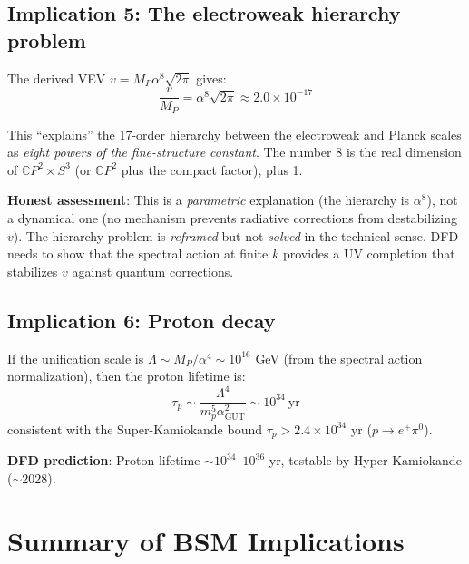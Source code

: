 \documentclass[11pt,a4paper]{article}
\newcommand{\CP}{\mathbb{C}P}
\begin{document}
\subsection{Implication 5: The electroweak hierarchy problem}

The derived VEV $v = M_P \alpha^8 \sqrt{2\pi}$ gives:
\begin{equation}
\frac{v}{M_P} = \alpha^8 \sqrt{2\pi} \approx 2.0 \times 10^{-17}
\end{equation}

This ``explains'' the 17-order hierarchy between the electroweak and Planck scales as \emph{eight powers of the fine-structure constant}. The number 8 is the real dimension of $\CP^2 \times S^3$ (or $\CP^2$ plus the compact factor), plus 1.

\textbf{Honest assessment}: This is a \emph{parametric} explanation (the hierarchy is $\alpha^8$), not a dynamical one (no mechanism prevents radiative corrections from destabilizing $v$). The hierarchy problem is \emph{reframed} but not \emph{solved} in the technical sense. DFD needs to show that the spectral action at finite $k$ provides a UV completion that stabilizes $v$ against quantum corrections.

\subsection{Implication 6: Proton decay}

If the unification scale is $\Lambda \sim M_P / \alpha^4 \sim 10^{16}$ GeV (from the spectral action normalization), then the proton lifetime is:
\begin{equation}
\tau_p \sim \frac{\Lambda^4}{m_p^5 \alpha_{\text{GUT}}^2} \sim 10^{34}~\text{yr}
\end{equation}
consistent with the Super-Kamiokande bound $\tau_p > 2.4 \times 10^{34}$ yr ($p \to e^+ \pi^0$).

\textbf{DFD prediction}: Proton lifetime $\sim 10^{34}$--$10^{36}$ yr, testable by Hyper-Kamiokande ($\sim 2028$).

\section{Summary of BSM Implications}
\end{document}
